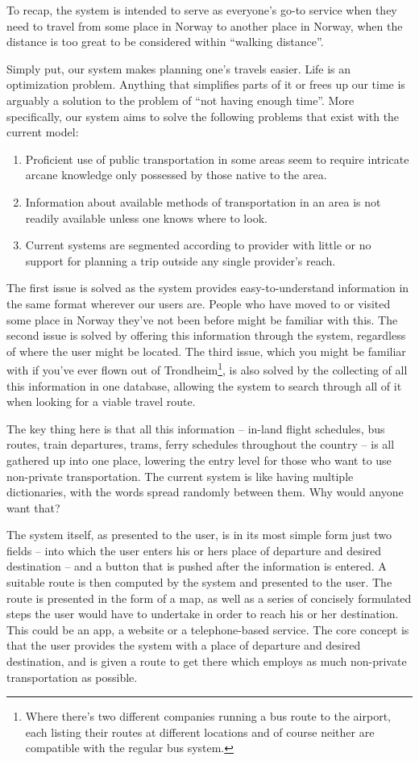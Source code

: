 To recap, the system is intended to serve as everyone's go-to service when they need to travel from some place in Norway to another place in Norway, when the distance is too great to be considered within ``walking distance''.

Simply put, our system makes planning one's travels easier.
Life is an optimization problem. Anything that simplifies parts of it or frees up our time is arguably a solution to the problem of ``not having enough time''.
More specifically, our system aims to solve the following problems that exist with the current model:
\begin{enumerate}
	\item{Proficient use of public transportation in some areas seem to require intricate arcane knowledge only possessed by those native to the area.}
	\item{Information about available methods of transportation in an area is not readily available unless one knows where to look.}
	\item{Current systems are segmented according to provider with little or no support for planning a trip outside any single provider's reach.}
\end{enumerate}
The first issue is solved as the system provides easy-to-understand information in the same format wherever our users are.
People who have moved to or visited some place in Norway they've not been before might be familiar with this.
The second issue is solved by offering this information through the system, regardless of where the user might be located.
The third issue, which you might be familiar with if you've ever flown out of Trondheim\footnote{Where there's two different companies running a bus route to the airport, each listing their routes at different locations and of course neither are compatible with the regular bus system.},
is also solved by the collecting of all this information in one database, allowing the system to search through all of it when looking for a viable travel route.

The key thing here is that all this information -- in-land flight schedules, bus routes, train departures, trams, ferry schedules throughout the country -- is all gathered up into one place, lowering the entry level for those who want to use non-private transportation.
The current system is like having multiple dictionaries, with the words spread randomly between them. Why would anyone want that?

The system itself, as presented to the user, is in its most simple form just two fields -- into which the user enters his or hers place of departure and desired destination -- and a button that is pushed after the information is entered.
A suitable route is then computed by the system and presented to the user.
The route is presented in the form of a map, as well as a series of concisely formulated steps the user would have to undertake in order to reach his or her destination.
This could be an app, a website or a telephone-based service. The core concept is that the user provides the system with a place of departure and desired destination, and is given a route to get there which employs as much non-private transportation as possible.	